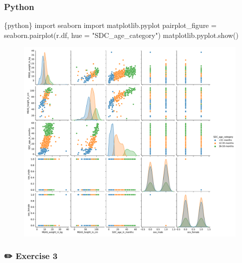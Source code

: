 \documentclass[
  letterpaper,
  DIV=11,
  numbers=noendperiod,
  oneside]{scrreprt}
\newenvironment{Shaded}{\begin{snugshade}}{\end{snugshade}}
\newcommand{\ImportTok}[1]{\textcolor[rgb]{0.00,0.46,0.62}{#1}}
\newcommand{\InformationTok}[1]{\textcolor[rgb]{0.37,0.37,0.37}{#1}}
\newcommand{\NormalTok}[1]{\textcolor[rgb]{0.00,0.23,0.31}{#1}}
\newcommand{\OperatorTok}[1]{\textcolor[rgb]{0.37,0.37,0.37}{#1}}
\newcommand{\StringTok}[1]{\textcolor[rgb]{0.13,0.47,0.30}{#1}}
\begin{document}
\hypertarget{python-6}{%
\subsubsection{Python}\label{python-6}}

\begin{Shaded}
\begin{Highlighting}[]
\InformationTok{\textasciigrave{}\textasciigrave{}\textasciigrave{}\{python\}}
\ImportTok{import}\NormalTok{ seaborn}
\ImportTok{import}\NormalTok{ matplotlib.pyplot}
\NormalTok{pairplot\_figure }\OperatorTok{=}\NormalTok{ seaborn.pairplot(r.df, hue }\OperatorTok{=} \StringTok{"SDC\_age\_category"}\NormalTok{)}
\NormalTok{matplotlib.pyplot.show()}
\InformationTok{\textasciigrave{}\textasciigrave{}\textasciigrave{}}
\end{Highlighting}
\end{Shaded}

\begin{figure}[H]

{\centering \includegraphics{./ds4ph_day3_session01_practical_session_files/figure-pdf/unnamed-chunk-15-1.pdf}

}

\end{figure}

\hypertarget{exercise-3-4}{%
\subsubsection{\texorpdfstring{{✏️} Exercise
3}{✏️ Exercise 3}}\label{exercise-3-4}}
\end{document}
